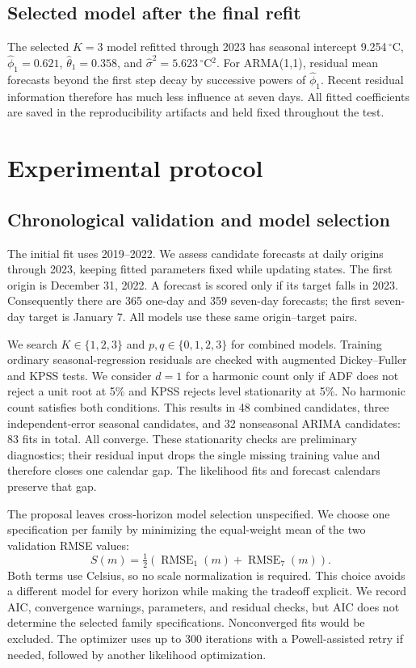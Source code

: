 \documentclass{article}
\begin{document}
\subsection{Selected model after the final refit}
The selected $K=3$ model refitted through 2023 has seasonal intercept
9.254\,$^\circ$C, $\widehat\phi_1=0.621$, $\widehat\theta_1=0.358$, and
$\widehat\sigma^2=5.623$\,$^\circ$C$^2$. For ARMA(1,1), residual mean forecasts
beyond the first step decay by successive powers of $\widehat\phi_1$.
Recent residual information therefore has much less influence at seven days.
All fitted coefficients are saved in the reproducibility artifacts and held
fixed throughout the test.

\newpage
\section{Experimental protocol}
\subsection{Chronological validation and model selection}
The initial fit uses 2019--2022. We assess candidate forecasts at daily origins
through 2023, keeping fitted parameters fixed while updating states. The first
origin is December 31, 2022. A forecast is scored only if its target falls in
2023. Consequently there are 365 one-day and 359 seven-day forecasts; the first
seven-day target is January 7. All models use these same origin--target pairs.

We search $K\in\{1,2,3\}$ and $p,q\in\{0,1,2,3\}$ for combined models.
Training ordinary seasonal-regression residuals are checked with augmented
Dickey--Fuller and KPSS tests. We consider $d=1$ for a harmonic count only if
ADF does not reject a unit root at 5\% and KPSS rejects level stationarity at
5\%. No harmonic count satisfies both conditions. This results in 48 combined
candidates, three independent-error seasonal candidates, and 32 nonseasonal
ARIMA candidates: 83 fits in total. All converge. These stationarity checks
are preliminary diagnostics; their residual input drops the single missing
training value and therefore closes one calendar gap. The likelihood fits and
forecast calendars preserve that gap.

The proposal leaves cross-horizon model selection unspecified. We choose one
specification per family by minimizing the equal-weight mean of the two
validation RMSE values:
\begin{equation}
S(m)=\tfrac12\left(\operatorname{RMSE}_{1}(m)+
\operatorname{RMSE}_{7}(m)\right).
\end{equation}
Both terms use Celsius, so no scale normalization is required. This choice
avoids a different model for every horizon while making the tradeoff explicit.
We record AIC, convergence warnings, parameters, and residual checks, but AIC
does not determine the selected family specifications. Nonconverged fits would
be excluded. The optimizer uses up to 300 iterations with a Powell-assisted
retry if needed, followed by another likelihood optimization.
\end{document}
